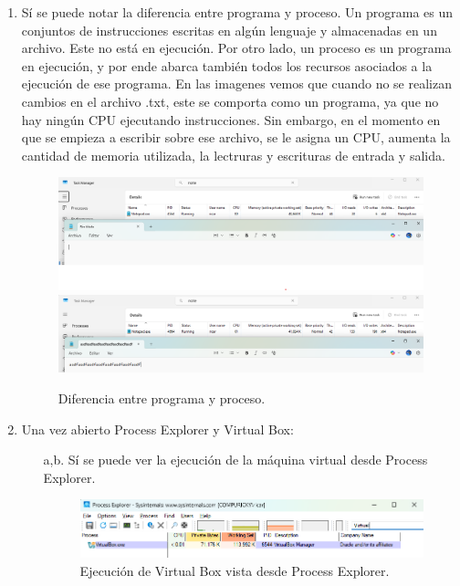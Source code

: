 \documentclass[12pt]{article}
\begin{document}
\begin{enumerate}[1.]
    \item Sí se puede notar la diferencia entre programa y proceso. Un programa es un conjuntos de instrucciones escritas en algún lenguaje y almacenadas en un archivo. Este no está en ejecución. Por otro lado, un proceso es un programa en ejecución, y por ende abarca también todos los recursos asociados a la ejecución de ese programa. En las imagenes vemos que cuando no se realizan cambios en el archivo .txt, este se comporta como un programa, ya que no hay ningún CPU ejecutando instrucciones. Sin embargo, en el momento en que se empieza a escribir sobre ese archivo, se le asigna un CPU, aumenta la cantidad de memoria utilizada, la lectruras y escrituras de entrada y salida.
      \begin{figure}[H]
        \centering
        \includegraphics[width=\linewidth]{../imagenes/bloc-notas-sin-escribir.png}
        \includegraphics[width=\linewidth]{../imagenes/bloc-notas-escribiendo.png}
        \caption{Diferencia entre programa y proceso.}
        \label{programa-vs-proceso}
      \end{figure}

    \item Una vez abierto Process Explorer y Virtual Box: 
      \begin{enumerate}[]
	  \item [a,b.] Sí se puede ver la ejecución de la máquina virtual desde Process Explorer.
	    \begin{figure}[H]
	      \centering
	      \includegraphics[width=\linewidth]{../imagenes/virtualbox-ejecutando.png}
	      \caption{Ejecución de Virtual Box vista desde Process Explorer.}
	      \label{vm-ejecutando}
	    \end{figure}


\end{enumerate}
\end{enumerate}
\end{document}
